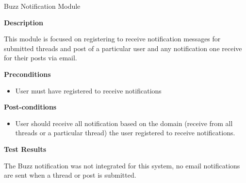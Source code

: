 \item Buzz Notification Module

\textbf{Description}

This module is focused on registering to receive notification messages for submitted threads and post of a particular user and any notification one receive for their posts via email.
 	
\textbf{Preconditions}
\begin{itemize}
	\item User must have registered to receive notifications 
\end{itemize}

\textbf{Post-conditions}
\begin{itemize}
\item User should receive all notification based on the domain (receive from all threads or a particular thread) the user registered to receive notifications.   
\end{itemize}

\textbf{Test Results}

The Buzz notification was not integrated for this system, no email notifications are sent when a thread or post is submitted. 